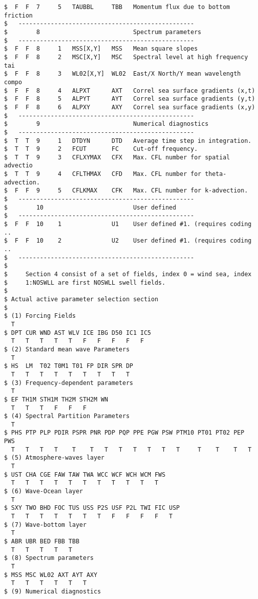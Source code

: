 \begin{footnotesize}
\begin{verbatim}
$  F  F  7     5   TAUBBL     TBB   Momentum flux due to bottom friction
$   -------------------------------------------------
$        8                          Spectrum parameters
$   -------------------------------------------------
$  F  F  8     1   MSS[X,Y]   MSS   Mean square slopes
$  F  F  8     2   MSC[X,Y]   MSC   Spectral level at high frequency tai
$  F  F  8     3   WL02[X,Y]  WL02  East/X North/Y mean wavelength compo
$  F  F  8     4   ALPXT      AXT   Correl sea surface gradients (x,t)
$  F  F  8     5   ALPYT      AYT   Correl sea surface gradients (y,t)
$  F  F  8     6   ALPXY      AXY   Correl sea surface gradients (x,y)
$   -------------------------------------------------
$        9                          Numerical diagnostics  
$   -------------------------------------------------
$  T  T  9     1   DTDYN      DTD   Average time step in integration.
$  T  T  9     2   FCUT       FC    Cut-off frequency.
$  T  T  9     3   CFLXYMAX   CFX   Max. CFL number for spatial advectio
$  T  T  9     4   CFLTHMAX   CFD   Max. CFL number for theta-advection.
$  F  F  9     5   CFLKMAX    CFK   Max. CFL number for k-advection. 
$   -------------------------------------------------
$        10                         User defined          
$   -------------------------------------------------
$  F  F  10    1              U1    User defined #1. (requires coding ..
$  F  F  10    2              U2    User defined #1. (requires coding ..
$   -------------------------------------------------
$
$     Section 4 consist of a set of fields, index 0 = wind sea, index
$     1:NOSWLL are first NOSWLL swell fields.
$
$ Actual active parameter selection section
$
$ (1) Forcing Fields
  T
$ DPT CUR WND AST WLV ICE IBG D50 IC1 IC5
  T   T   T   T   T   F   F   F   F   F
$ (2) Standard mean wave Parameters
  T
$ HS  LM  T02 T0M1 T01 FP DIR SPR DP
  T   T   T   T   T   T   T   T   T
$ (3) Frequency-dependent parameters
  T
$ EF TH1M STH1M TH2M STH2M WN
  T   T   T   F   F   F
$ (4) Spectral Partition Parameters
  T
$ PHS PTP PLP PDIR PSPR PNR PDP PQP PPE PGW PSW PTM10 PT01 PT02 PEP PWS 
  T   T   T   T    T    T   T   T   T   T   T   T     T    T    T   T   
$ (5) Atmosphere-waves layer
  T
$ UST CHA CGE FAW TAW TWA WCC WCF WCH WCM FWS
  T   T   T   T   T   T   T   T   T   T   T
$ (6) Wave-Ocean layer
  T
$ SXY TWO BHD FOC TUS USS P2S USF P2L TWI FIC USP
  T   T   T   T   T   T   T   F   F   F   F   T
$ (7) Wave-bottom layer
  T
$ ABR UBR BED FBB TBB
  T   T   T   T   T
$ (8) Spectrum parameters
  T
$ MSS MSC WL02 AXT AYT AXY
  T   T   T   T   T   T
$ (9) Numerical diagnostics

\end{verbatim}
\end{footnotesize}
